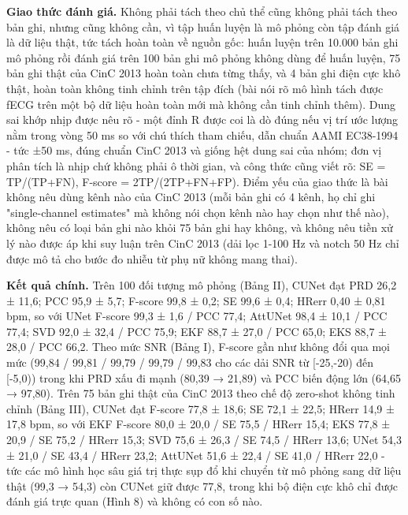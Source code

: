 \documentclass[12pt,a4paper]{article}
\begin{document}
\noindent \textbf{Giao thức đánh giá.} Không phải tách theo chủ thể cũng không phải tách theo bản ghi, nhưng cũng không cần, vì tập huấn luyện là mô phỏng còn tập đánh giá là dữ liệu thật, tức tách hoàn toàn về nguồn gốc: huấn luyện trên 10.000 bản ghi mô phỏng rồi đánh giá trên 100 bản ghi mô phỏng không dùng để huấn luyện, 75 bản ghi thật của CinC 2013 hoàn toàn chưa từng thấy, và 4 bản ghi điện cực khô thật, hoàn toàn không tinh chỉnh trên tập đích (bài nói rõ mô hình tách được fECG trên một bộ dữ liệu hoàn toàn mới mà không cần tinh chỉnh thêm). Dung sai khớp nhịp được nêu rõ - một đỉnh R được coi là dò đúng nếu vị trí ước lượng nằm trong vòng 50 ms so với chú thích tham chiếu, dẫn chuẩn AAMI EC38-1994 - tức ±50 ms, đúng chuẩn CinC 2013 và giống hệt dung sai của nhóm; đơn vị phân tích là nhịp chứ không phải ô thời gian, và công thức cũng viết rõ: SE = TP/(TP+FN), F-score = 2TP/(2TP+FN+FP). Điểm yếu của giao thức là bài không nêu dùng kênh nào của CinC 2013 (mỗi bản ghi có 4 kênh, họ chỉ ghi "single-channel estimates" mà không nói chọn kênh nào hay chọn như thế nào), không nêu có loại bản ghi nào khỏi 75 bản ghi hay không, và không nêu tiền xử lý nào được áp khi suy luận trên CinC 2013 (dải lọc 1-100 Hz và notch 50 Hz chỉ được mô tả cho bước đo nhiễu từ phụ nữ không mang thai).\par\vspace{3pt}
\noindent \textbf{Kết quả chính.} Trên 100 đối tượng mô phỏng (Bảng II), CUNet đạt PRD 26,2 ± 11,6; PCC 95,9 ± 5,7; F-score 99,8 ± 0,2; SE 99,6 ± 0,4; HRerr 0,40 ± 0,81 bpm, so với UNet F-score 99,3 ± 1,6 / PCC 77,4; AttUNet 98,4 ± 10,1 / PCC 77,4; SVD 92,0 ± 32,4 / PCC 75,9; EKF 88,7 ± 27,0 / PCC 65,0; EKS 88,7 ± 28,0 / PCC 66,2. Theo mức SNR (Bảng I), F-score gần như không đổi qua mọi mức (99,84 / 99,81 / 99,79 / 99,79 / 99,83 cho các dải SNR từ [-25,-20) đến [-5,0)) trong khi PRD xấu đi mạnh (80,39 → 21,89) và PCC biến động lớn (64,65 → 97,80). Trên 75 bản ghi thật của CinC 2013 theo chế độ zero-shot không tinh chỉnh (Bảng III), CUNet đạt F-score 77,8 ± 18,6; SE 72,1 ± 22,5; HRerr 14,9 ± 17,8 bpm, so với EKF F-score 80,0 ± 20,0 / SE 75,5 / HRerr 15,4; EKS 77,8 ± 20,9 / SE 75,2 / HRerr 15,3; SVD 75,6 ± 26,3 / SE 74,5 / HRerr 13,6; UNet 54,3 ± 21,0 / SE 43,4 / HRerr 23,2; AttUNet 51,6 ± 22,4 / SE 41,0 / HRerr 22,0 - tức các mô hình học sâu giá trị thực sụp đổ khi chuyển từ mô phỏng sang dữ liệu thật (99,3 → 54,3) còn CUNet giữ được 77,8, trong khi bộ điện cực khô chỉ được đánh giá trực quan (Hình 8) và không có con số nào.\par\vspace{3pt}
\end{document}
